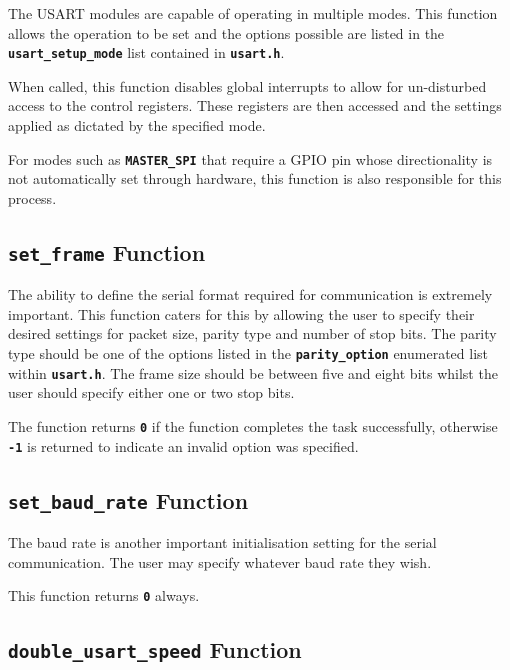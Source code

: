 \documentclass[a4paper, oneside, 11pt, titlepage, onecolumn, openright]{report}
\begin{document}
					The USART modules are capable of operating in multiple modes. This function allows the operation to be set and the options possible are listed in the \textbf{\texttt{usart\_setup\_mode}} list contained in \textbf{\texttt{usart.h}}.
			
When called, this function disables global interrupts to allow for un-disturbed access to the control registers. These registers are then accessed and the settings applied as dictated by the specified mode.
			
For modes such as \textbf{\texttt{MASTER\_SPI}} that require a GPIO pin whose directionality is not automatically set through hardware, this function is also responsible for this process.
			
				\subsection{\textbf{\texttt{set\_frame}} Function}
					\label{ss:Hardware Abstraction Libraries:usart Module:set_frameFunction}
			
					The ability to define the serial format required for communication is extremely important. This function caters for this by allowing the user to specify their desired settings for packet size, parity type and number of stop bits. The parity type should be one of the options listed in the \textbf{\texttt{parity\_option}} enumerated list within \textbf{\texttt{usart.h}}. The frame size should be between five and eight bits whilst the user should specify either one or two stop bits.
			
The function returns \textbf{\texttt{0}} if the function completes the task successfully, otherwise \textbf{\texttt{-1}} is returned to indicate an invalid option was specified.
			
				\subsection{\textbf{\texttt{set\_baud\_rate}} Function}
					\label{ss:Hardware Abstraction Libraries:usart Module:set_baud_rateFunction}
			
					The baud rate is another important initialisation setting for the serial communication. The user may specify whatever baud rate they wish.
					
This function returns \textbf{\texttt{0}} always.

				\subsection{\textbf{\texttt{double\_usart\_speed}} Function}
					\label{ss:Hardware Abstraction Libraries:usart Module:double_usart_speedFunction}
			
\end{document}
